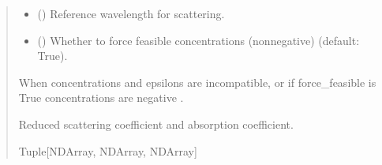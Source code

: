 \documentclass[letterpaper,10pt,english]{sphinxmanual}
\begin{document}
\begin{fulllineitems}
\begin{quote}
\begin{description}
\begin{itemize}
\item {} 
\sphinxAtStartPar
{} () \textendash{} Reference wavelength for scattering.

\item {} 
\sphinxAtStartPar
{} () \textendash{} Whether to force feasible concentrations (non\sphinxhyphen{}negative) (default: True).

\end{itemize}

\sphinxAtStartPar
{\hyperref[\detokenize{generated/photon_canon.utils:photon_canon.utils.OpticalPropertyError}]{}} \textendash{} When concentrations and epsilons are incompatible, or if force\_feasible is True
concentrations are negative .

\sphinxAtStartPar
Reduced scattering coefficient and absorption coefficient.

\sphinxAtStartPar
Tuple{[}NDArray, NDArray, NDArray{]}

\end{description}\end{quote}

\end{fulllineitems}

\end{document}
